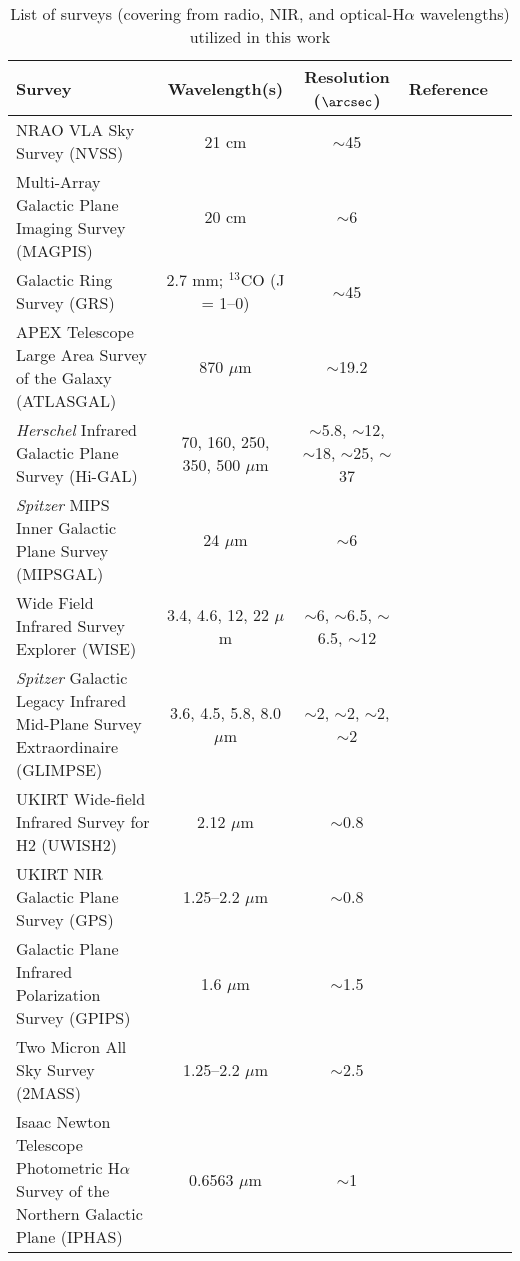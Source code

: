 \documentclass[iop]{emulateapj}
\begin{document}
 \begin{table*}
  \tiny
\setlength{\tabcolsep}{0.05in}
\centering
\caption{List of surveys (covering from radio, NIR, and optical-H$\alpha$ wavelengths) utilized in this work}
\label{ftab1}
\begin{tabular}{lcccr}
\hline 
  Survey  &  Wavelength(s)       &  Resolution ($\arcsec$)        &  Reference  \\   
\hline
\hline 
 NRAO VLA Sky Survey (NVSS)                                                             &21 cm            & $\sim$45        &       \citet{condon98}    \\     
 Multi-Array Galactic Plane Imaging Survey (MAGPIS)                             & 20 cm                       & $\sim$6          & \citet{helfand06}\\
 Galactic Ring Survey (GRS)                                                                   & 2.7 mm; $^{13}$CO (J = 1--0) & $\sim$45        &\citet{jackson06}\\
APEX Telescope Large Area Survey of the Galaxy (ATLASGAL)                 &870 $\mu$m                     & $\sim$19.2        &\citet{schuller09}\\
{\it Herschel} Infrared Galactic Plane Survey (Hi-GAL)                              &70, 160, 250, 350, 500 $\mu$m                     & $\sim$5.8, $\sim$12, $\sim$18, $\sim$25, $\sim$37         &\citet{molinari10}\\
{\it Spitzer} MIPS Inner Galactic Plane Survey (MIPSGAL)                                         &24 $\mu$m                     & $\sim$6         &\citet{carey05}\\ 
Wide Field Infrared Survey Explorer (WISE)                                             &3.4, 4.6, 12, 22 $\mu$m                   & $\sim$6, $\sim$6.5, $\sim$6.5, $\sim$12           &\citet{wright10}\\ 
{\it Spitzer} Galactic Legacy Infrared Mid-Plane Survey Extraordinaire (GLIMPSE)       &3.6, 4.5, 5.8, 8.0  $\mu$m                   & $\sim$2, $\sim$2, $\sim$2, $\sim$2           &\citet{benjamin03}\\
UKIRT Wide-field Infrared Survey for H2 (UWISH2)                                 &2.12 $\mu$m                   & $\sim$0.8          &\citet{froebrich11a}\\ 
UKIRT NIR Galactic Plane Survey (GPS)                                                 &1.25--2.2 $\mu$m                   &$\sim$0.8           &\citet{lawrence07}\\ 
Galactic Plane Infrared Polarization Survey (GPIPS)                                 &1.6 $\mu$m                   & $\sim$1.5          &\citet{clemens12}\\
Two Micron All Sky Survey (2MASS)                                                 &1.25--2.2 $\mu$m                  & $\sim$2.5          &\citet{skrutskie06}\\
Isaac Newton Telescope Photometric H$\alpha$ Survey of the Northern Galactic Plane (IPHAS) &0.6563 $\mu$m                  & $\sim$1          &\citet{drew05}\\
\hline          
\end{tabular}
\end{table*}
\end{document}
